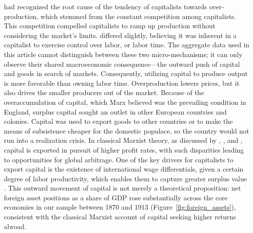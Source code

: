 \documentclass[10pt]{article}
\begin{document}
\par \citet{engels1844outlines} had recognized the root cause of the tendency of capitalists towards over-production, which stemmed from the constant competition among capitalists. This competition compelled capitalists to ramp up production without considering the market's limits. \citet{marx1996kapital} differed slightly, believing it was inherent in a capitalist to exercise control over labor, or labor time. The aggregate data used in this article cannot distinguish between these two micro-mechanisms; it can only observe their shared macroeconomic consequence---the outward push of capital and goods in search of markets. Consequently, utilizing capital to produce output is more favorable than owning labor time. Overproduction lowers prices, but it also drives the smaller producers out of the market. Because of the overaccumulation of capital, which Marx believed was the prevailing condition in England, surplus capital sought an outlet in other European countries and colonies. Capital was used to export goods to other countries or to make the means of subsistence cheaper for the domestic populace, so the country would not run into a realization crisis. In classical Marxist theory, as discussed by \citet{hilferding1981finance}, \citet{lenin1999imperialism}, and \citet{bukharin1929imperialism}, capital is exported in pursuit of higher profit rates, with such disparities leading to opportunities for global arbitrage. One of the key drivers for capitalists to export capital is the existence of international wage differentials, given a certain degree of labor productivity, which enables them to capture greater surplus value \citep{smith2016imperialism, suwandi2019value}. This outward movement of capital is not merely a theoretical proposition: net foreign asset positions as a share of GDP rose substantially across the core economies in our sample between 1870 and 1913 (Figure~\ref{fig:foreign_assets}), consistent with the classical Marxist account of capital seeking higher returns abroad.
\end{document}
